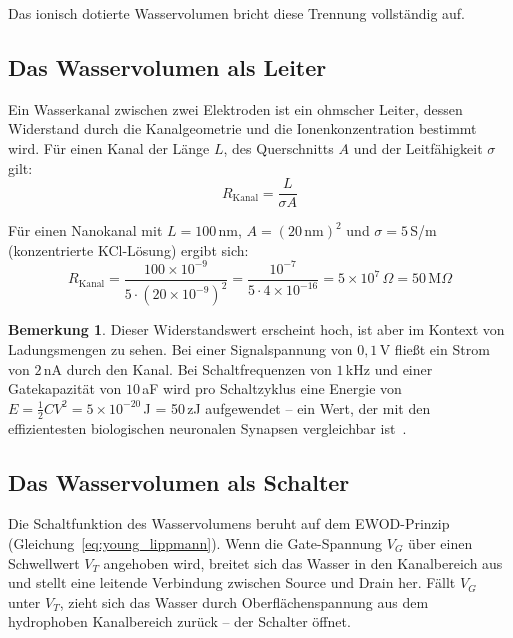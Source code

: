 ﻿\documentclass[a4paper,12pt]{scrreprt}
\theoremstyle{definition}
\newtheorem{bemerkung}{Bemerkung}[section]
\begin{document}
Das ionisch dotierte Wasservolumen bricht diese Trennung vollständig auf.

\subsection{Das Wasservolumen als Leiter}

Ein Wasserkanal zwischen zwei Elektroden ist ein ohmscher Leiter, dessen
Widerstand durch die Kanalgeometrie und die Ionenkonzentration bestimmt wird.
Für einen Kanal der Länge $L$, des Querschnitts $A$ und der Leitfähigkeit
$\sigma$ gilt:
\begin{equation}
	R_{\mathrm{Kanal}} = \frac{L}{\sigma A}
	\label{eq:kanalwiderstand}
\end{equation}

Für einen Nanokanal mit $L = 100$\,nm, $A = (20\,\text{nm})^2$ und
$\sigma = 5$\,S/m (konzentrierte KCl-Lösung) ergibt sich:
\begin{equation}
	R_{\mathrm{Kanal}} = \frac{100 \times 10^{-9}}{5 \cdot (20 \times 10^{-9})^2}
	= \frac{10^{-7}}{5 \cdot 4 \times 10^{-16}} = 5 \times 10^7\,\Omega = 50\,\text{M}\Omega
	\label{eq:beispiel_widerstand}
\end{equation}

\begin{bemerkung}
	Dieser Widerstandswert erscheint hoch, ist aber im Kontext von
	Ladungsmengen zu sehen. Bei einer Signalspannung von $0{,}1$\,V fließt
	ein Strom von $2$\,nA durch den Kanal. Bei Schaltfrequenzen von $1$\,kHz
	und einer Gatekapazität von $10$\,aF wird pro Schaltzyklus eine Energie von
	$E = \frac{1}{2}CV^2 = 5 \times 10^{-20}$\,J = 50\,zJ aufgewendet -- ein
	Wert, der mit den effizientesten biologischen neuronalen Synapsen
	vergleichbar ist~\cite{laughlin2001}.
\end{bemerkung}

\subsection{Das Wasservolumen als Schalter}

Die Schaltfunktion des Wasservolumens beruht auf dem EWOD-Prinzip
(Gleichung~\ref{eq:young_lippmann}). Wenn die Gate-Spannung $V_G$ über einen
Schwellwert $V_T$ angehoben wird, breitet sich das Wasser in den Kanalbereich
aus und stellt eine leitende Verbindung zwischen Source und Drain her. Fällt
$V_G$ unter $V_T$, zieht sich das Wasser durch Oberflächenspannung aus dem
hydrophoben Kanalbereich zurück -- der Schalter öffnet.
\end{document}
